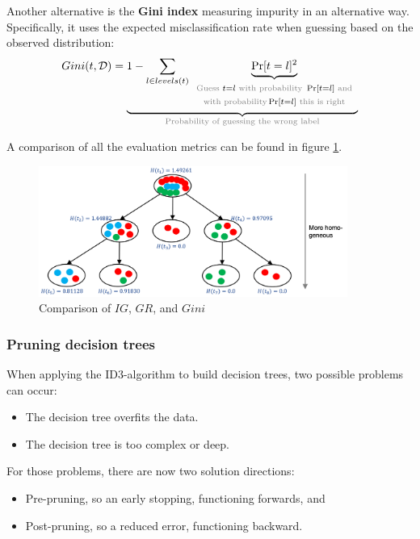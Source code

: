Another alternative is the \textbf{Gini index} measuring impurity in an alternative way. Specifically, it uses the expected misclassification rate when guessing based on the observed distribution:
\renewcommand{\arraystretch}{0.6}
\begin{align*}
  Gini(t,\mathcal{D}) = \underbrace{1-\sum_{l\in levels(t)}\underbrace{\Pr[t=l]^2}_{\begin{array}{c}
    \scriptstyle\text{\color{gray}Guess } t=l \text{ \color{gray} with probability } \Pr[t=l] \text{ \color{gray} and}\\
    \scriptstyle\text{\color{gray}with probability}  \Pr[t=l] \text{ \color{gray} this is right}
  \end{array}}}_{\text{\color{gray}Probability of guessing the wrong label}}
\end{align*}
\renewcommand{\arraystretch}{1} 

A comparison of all the evaluation metrics can be found in figure \ref{fig:3_id3_alternative_evaluation}.

\begin{figure}[h]
  \centering
  \includegraphics[width=0.9\textwidth]{assets/trees/id3/comp_evaluation_metrics.png}
  \caption{Comparison of $IG$, $GR$, and $Gini$}
  \label{fig:3_id3_alternative_evaluation}
\end{figure}


\subsubsection*{Pruning decision trees}
When applying the ID3-algorithm to build decision trees, two possible problems can occur:
\begin{itemize}
  \item The decision tree overfits the data.
  \item The decision tree is too complex or deep.
\end{itemize}
For those problems, there are now two solution directions:
\begin{itemize}
  \item Pre-pruning, so an early stopping, functioning forwards, and
  \item Post-pruning, so a reduced error, functioning backward.
\end{itemize}

